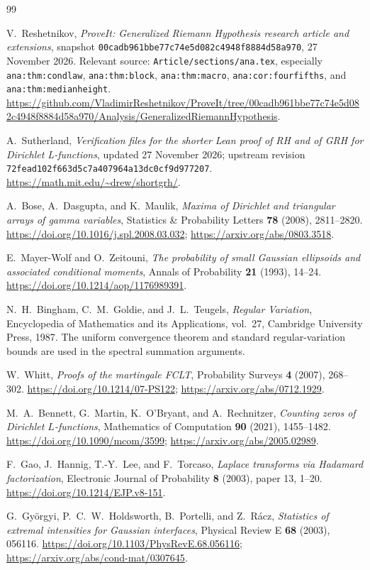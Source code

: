 \documentclass[11pt]{article}
\theoremstyle{definition}
\theoremstyle{remark}
\begin{document}
\begin{thebibliography}{99}
\small\raggedright

V.~Reshetnikov, \emph{ProveIt: Generalized Riemann Hypothesis research
article and extensions}, snapshot
\texttt{00cadb961bbe77c74e5d082c4948f8884d58a970}, 27 November 2026.
Relevant source: \texttt{Article/sections/ana.tex}, especially
\texttt{ana:thm:condlaw}, \texttt{ana:thm:block},
\texttt{ana:thm:macro}, \texttt{ana:cor:fourfifths}, and
\texttt{ana:thm:medianheight}.
\url{https://github.com/VladimirReshetnikov/ProveIt/tree/00cadb961bbe77c74e5d082c4948f8884d58a970/Analysis/GeneralizedRiemannHypothesis}.

A.~Sutherland, \emph{Verification files for the shorter Lean proof of RH
and of GRH for Dirichlet L-functions}, updated 27 November 2026;
upstream revision \texttt{72fead102f663d5c7a407964a13dc0cf9d977207}.
\url{https://math.mit.edu/~drew/shortgrh/}.

A.~Bose, A.~Dasgupta, and K.~Maulik,
\emph{Maxima of Dirichlet and triangular arrays of gamma variables},
Statistics \& Probability Letters \textbf{78} (2008), 2811--2820.
\url{https://doi.org/10.1016/j.spl.2008.03.032};
\url{https://arxiv.org/abs/0803.3518}.

E.~Mayer-Wolf and O.~Zeitouni,
\emph{The probability of small Gaussian ellipsoids and associated
conditional moments}, Annals of Probability \textbf{21} (1993), 14--24.
\url{https://doi.org/10.1214/aop/1176989391}.

N.~H.~Bingham, C.~M.~Goldie, and J.~L.~Teugels,
\emph{Regular Variation}, Encyclopedia of Mathematics and its
Applications, vol.~27, Cambridge University Press, 1987.
The uniform convergence theorem and standard regular-variation bounds
are used in the spectral summation arguments.

W.~Whitt, \emph{Proofs of the martingale FCLT},
Probability Surveys \textbf{4} (2007), 268--302.
\url{https://doi.org/10.1214/07-PS122};
\url{https://arxiv.org/abs/0712.1929}.

M.~A.~Bennett, G.~Martin, K.~O'Bryant, and A.~Rechnitzer,
\emph{Counting zeros of Dirichlet $L$-functions},
Mathematics of Computation \textbf{90} (2021), 1455--1482.
\url{https://doi.org/10.1090/mcom/3599};
\url{https://arxiv.org/abs/2005.02989}.

F.~Gao, J.~Hannig, T.-Y.~Lee, and F.~Torcaso,
\emph{Laplace transforms via Hadamard factorization},
Electronic Journal of Probability \textbf{8} (2003), paper 13, 1--20.
\url{https://doi.org/10.1214/EJP.v8-151}.

G.~Gy\"orgyi, P.~C.~W.~Holdsworth, B.~Portelli, and Z.~R\'acz,
\emph{Statistics of extremal intensities for Gaussian interfaces},
Physical Review E \textbf{68} (2003), 056116.
\url{https://doi.org/10.1103/PhysRevE.68.056116};
\url{https://arxiv.org/abs/cond-mat/0307645}.

\end{thebibliography}
\end{document}
